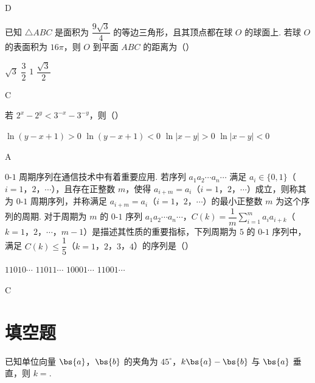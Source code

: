 \begin{answer}
D
\end{answer}

\begin{problem}
已知 \(\triangle ABC\) 是面积为 \(\dfrac{9\sqrt3}{4}\) 的等边三角形，且其顶点都在球 \(O\) 的球面上. 若球 \(O\) 的表面积为 \(16\pi\)，则 \(O\) 到平面 \(ABC\) 的距离为（\quad）

\choices
    {\(\sqrt3\)}
    {\(\dfrac{3}{2}\)}
    {\(1\)}
    {\(\dfrac{\sqrt3}{2}\)}
\end{problem}

\begin{answer}
C
\end{answer}

\begin{problem}
若 \(2^x-2^y<3^{-x}-3^{-y}\)，则（\quad）

\choices
    {\(\ln \left( y-x+1 \right)>0\)}
    {\(\ln \left( y-x+1 \right)<0\)}
    {\(\ln \left| x-y \right|>0\)}
    {\(\ln \left| x-y \right|<0\)}
\end{problem}

\begin{answer}
A
\end{answer}

\begin{problem}
\(0\)-\(1\) 周期序列在通信技术中有着重要应用. 若序列 \(a_1a_2\cdots a_n\cdots\) 满足 \(a_i\in\{0,1\}\)（\(i=1\)，\(2\)，\(\cdots\)），且存在正整数 \(m\)，使得 \(a_{i+m}=a_i\)（\(i=1\)，\(2\)，\(\cdots\)）成立，则称其为 \(0\)-\(1\) 周期序列，并称满足 \(a_{i+m}=a_i\)（\(i=1\)，\(2\)，\(\cdots\)）的最小正整数 \(m\) 为这个序列的周期. 对于周期为 \(m\) 的 \(0\)-\(1\) 序列 \(a_1a_2\cdots a_n\cdots\)，\(C(k)=\dfrac{1}{m}\sum_{i=1}^{m} a_i a_{i+k}\)（\(k=1\)，\(2\)，\(\cdots\)，\(m-1\)）是描述其性质的重要指标，下列周期为 \(5\) 的 \(0\)-\(1\) 序列中，满足 \(C(k)\leq \dfrac{1}{5}\)（\(k=1\)，\(2\)，\(3\)，\(4\)）的序列是（\quad）

\choices
    {\(11010\cdots\)}
    {\(11011\cdots\)}
    {\(10001\cdots\)}
    {\(11001\cdots\)}
\end{problem}

\begin{answer}
C
\end{answer}

\section{填空题}

\begin{problem}
已知单位向量 \(\bs{a}\)，\(\bs{b}\) 的夹角为 \(45^\circ\)，\(k\bs{a}-\bs{b}\) 与 \(\bs{a}\) 垂直，则 \(k=\)\fillinblank{}.
\end{problem}

